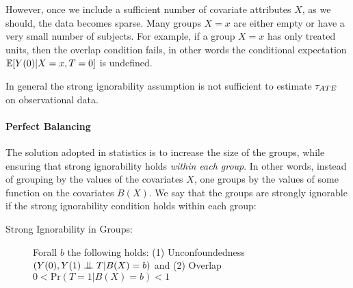 However, once we include a sufficient number of covariate attributes $X$,
as we should, the data becomes sparse. Many groups $X=x$ are
either empty or have a very small number of subjects.  For example, if a
group $X=x$ has only treated units, then the overlap condition fails, in
other words the conditional expectation $\mathbb{E}[Y(0)|X=x,T=0]$ is
undefined.

In general the strong ignorability assumption is not sufficient to estimate ${\tau_{ATE}}$ on
observational data.


\vspace{-0.3cm}
\paragraph*{Perfect Balancing}
The solution adopted in statistics is to increase the size of the
groups, while ensuring that strong ignorability holds {\em within each
  group}.  In other words, instead of grouping by the values of the
covariates $X$, one groups by the values of some function on the
covariates $B(X)$.  We say that the groups are strongly ignorable if
the strong ignorability condition holds within each group: \vspace{-0.1cm}
\begin{description}
\item[Strong Ignorability in Groups:] Forall $b$ the following holds:
%
  \newline (1) Unconfoundedness $({Y(0), Y(1) \bigCI T} | B(X)=b)$ and
%
  \newline (2) Overlap $0 < \textrm{Pr}(T = 1 | B(X)=b) < 1$
\end{description}

